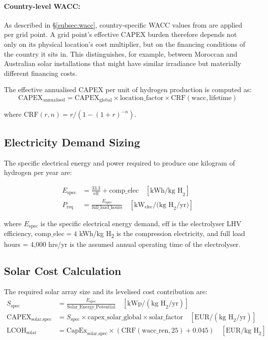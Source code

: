 \paragraph{Country-level WACC:} As described in \S\ref{subsec:wacc}, country-specific WACC values from \cite{Hatton2025} are applied per grid point. A grid point's effective CAPEX burden therefore depends not only on its physical location's cost multiplier, but on the financing conditions of the country it sits in. This distinguishes, for example, between Moroccan and Australian solar installations that might have similar irradiance but materially different financing costs.

The effective annualised CAPEX per unit of hydrogen production is computed as:
\[ \text{CAPEX}_{\text{annualised}} = \text{CAPEX}_{\text{global}} \times \text{location\_factor} \times \text{CRF}(\text{wacc}, \text{lifetime}) \]

where $\text{CRF}(r, n) = r / (1 - (1+r)^{-n})$.

\subsection{Electricity Demand Sizing}

The specific electrical energy and power required to produce one kilogram of hydrogen per year are:

\begin{align}
    E_{\text{spec}} &= \frac{33.3}{\text{eff}} + \text{comp\_elec} \quad [\text{kWh/kg H}_2] \\
    P_{\text{req}} &= \frac{E_{\text{spec}}}{\text{full\_load\_hours}} \quad [\text{kW}_{\text{elec}}/\text{(kg H}_2\text{/yr)}]
\end{align}

where $E_{\text{spec}}$ is the specific electrical energy demand, $\text{eff}$ is the electrolyser LHV efficiency, $\text{comp\_elec} = 4$ kWh/kg H\textsubscript{2} is the compression electricity, and full load hours = 4{,}000 hrs/yr is the assumed annual operating time of the electrolyser.

\subsection{Solar Cost Calculation}

The required solar array size and its levelised cost contribution are:
\begin{align}
    S_{\text{spec}} &= \frac{E_{\text{spec}}}{\text{Solar\_Energy\_Potential}} \quad [\text{kWp}/(\text{kg H}_2\text{/yr})] \\
    \text{CAPEX}_{\text{solar,spec}} &= S_{\text{spec}} \times \text{capex\_solar\_global} \times \text{solar\_factor} \quad [\text{EUR}/(\text{kg H}_2\text{/yr})] \\
    \text{LCOH}_{\text{solar}} &= \text{CapEx}_{\text{solar,spec}} \times \left( \text{CRF}(\text{wacc\_ren}, 25) + 0.045 \right) \quad [\text{EUR}/\text{kg H}_2]
\end{align}

